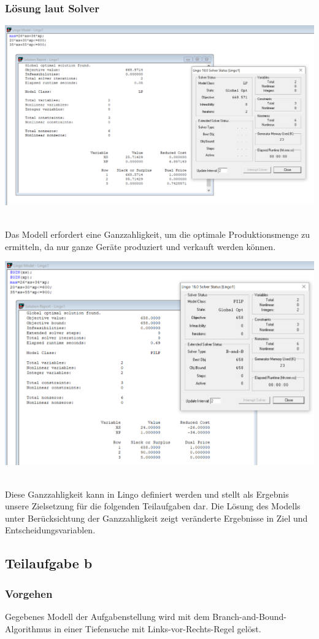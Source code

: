 \documentclass[a4paper,11pt]{article}
\begin{document}
\subsubsection*{Lösung laut Solver}
\begin{centering}
	\includegraphics[width=0.65\linewidth]{src/blatt_5_aufgabe_2_teilaufgabe_a_loesung_solver_decimal.png}
\end{centering}
\\
Das Modell erfordert eine Ganzzahligkeit, um die optimale Produktionsmenge zu ermitteln, da nur ganze Geräte produziert und verkauft werden können.
\bigbreak
\begin{centering}
	\includegraphics[width=0.65\linewidth]{src/blatt_5_aufgabe_2_teilaufgabe_a_loesung_solver_integer.png}
\end{centering}
\\
Diese Ganzzahligkeit kann in Lingo definiert werden und stellt als Ergebnis unsere Zielsetzung für die folgenden Teilaufgaben dar. Die Lösung des Modells unter Berücksichtung der Ganzzahligkeit zeigt veränderte Ergebnisse in Ziel und Entscheidungsvariablen.
\pagebreak

\subsection*{Teilaufgabe b}
\subsubsection*{Vorgehen}
Gegebenes Modell der Aufgabenstellung wird mit dem Branch-and-Bound-Algorithmus in einer Tiefensuche mit Links-vor-Rechts-Regel gelöst.
\end{document}
